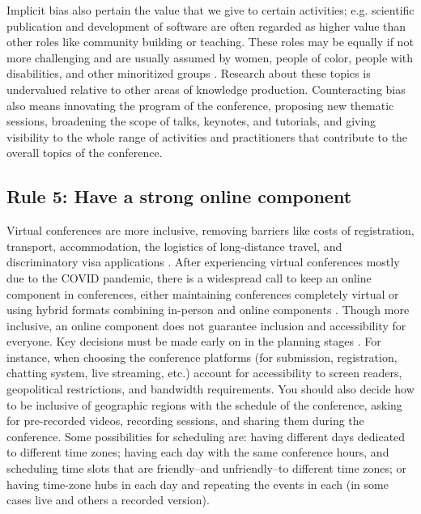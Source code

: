 \documentclass[10pt,letterpaper]{article}
\begin{document}

Implicit bias also pertain the value that we give to certain activities; e.g. scientific publication and development of software are often regarded as higher value than other roles like community building or teaching. 
These roles may be equally if not more challenging and are usually assumed by women, people of color, people with disabilities, and other minoritized groups \cite{cheng2020x+, burfordHomelinessMeantHaving2020}. Research about these topics is undervalued relative to other areas of knowledge production. 
Counteracting bias also means innovating the program of the conference, proposing new thematic sessions, broadening the scope of talks, keynotes, and tutorials, and giving visibility to the whole range of activities and practitioners that contribute to the overall topics of the conference. 


\subsection*{Rule 5: Have a strong online component} 
\label{rule_online}

Virtual conferences are more inclusive, removing barriers like costs of registration, transport, accommodation, the logistics of long-distance travel, and discriminatory visa applications \cite{jooKeepOnlineOption2021, ninerBetterWhomLeveling2021, salibaGettingGripsOnline2020, gichoraTenSimpleRules2010a}. 
After experiencing virtual conferences mostly due to the COVID pandemic, there is a widespread call to keep an online component in conferences, either maintaining conferences completely virtual or using hybrid formats combining in-person and online components \cite{jooKeepOnlineOption2021, woolstonLearningLoveVirtual2020, ninerBetterWhomLeveling2021, roosOnlineConferencesNew2020, levitisCenteringInclusivityDesign2021, sarabipourChangingScientificMeetings2021}.
Though more inclusive, an online component does not guarantee inclusion and accessibility for everyone.
Key decisions must be made early on in the planning stages \cite{levitisCenteringInclusivityDesign2021}. For instance, when choosing the conference platforms (for submission, registration, chatting system, live streaming, etc.) account for accessibility to screen readers, geopolitical restrictions, and bandwidth requirements. 
You should also decide how to be inclusive of geographic regions with the schedule of the conference, asking for pre-recorded videos, recording sessions, and sharing them during the conference. Some possibilities for scheduling are: having different days dedicated to different time zones; having each day with the same conference hours, and scheduling time slots that are friendly--and unfriendly--to different time zones; or having time-zone hubs in each day and repeating the events in each (in some cases live and others a recorded version).
\end{document}
